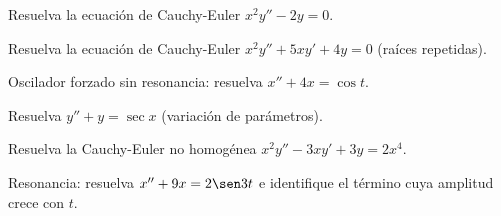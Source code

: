 \begin{prob}
Resuelva la ecuación de Cauchy-Euler $x^2 y'' - 2y = 0$.
\end{prob}

\begin{prob}
Resuelva la ecuación de Cauchy-Euler $x^2 y'' + 5x y' + 4y = 0$ (raíces repetidas).
\end{prob}

\begin{prob}
Oscilador forzado sin resonancia: resuelva $x'' + 4x = \cos t$.
\end{prob}

\begin{prob}
Resuelva $y'' + y = \sec x$ (variación de parámetros).
\end{prob}

\begin{prob}
Resuelva la Cauchy-Euler no homogénea $x^2 y'' - 3x y' + 3y = 2x^4$.
\end{prob}

\begin{prob}
Resonancia: resuelva $x'' + 9x = 2\sen 3t$ e identifique el término cuya amplitud crece con $t$.
\end{prob}